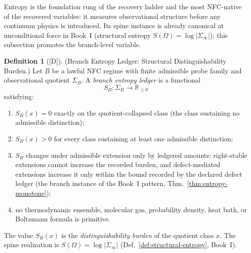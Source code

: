 \documentclass[12pt,oneside]{amsbook}
\theoremstyle{plain}
\theoremstyle{definition}
\newtheorem{definition}[theorem]{Definition}
\theoremstyle{remark}
\newcommand{\status}[1]{\textup{[#1]}}
\begin{document}
Entropy is the foundation rung of the recovery ladder and the most
NFC-native of the recovered variables: it measures observational
structure before any continuum physics is introduced.  Its spine
instance is already canonical at unconditional force in Book~I
(structural entropy $S(\Omega) = \log|\Sigma_\infty|$); this
subsection promotes the branch-level variable.

\begin{definition}[\status{D}]\label{def:branch-entropy-ledger}
\textup{(Branch Entropy Ledger: Structural Distinguishability
Burden.)}
Let $B$ be a lawful NFC regime with finite admissible probe family
and observational quotient $\Sigma_B$.  A \emph{branch entropy
ledger} is a functional
\[
  S_B : \Sigma_B \longrightarrow \mathbb{R}_{\ge 0}
\]
satisfying:
\begin{enumerate}[label=\textup{(S\arabic*)}]
  \item\label{es:zero} $S_B(x) = 0$ exactly on the
    quotient-collapsed class (the class sustaining no admissible
    distinction);
  \item\label{es:pos} $S_B(x) > 0$ for every class sustaining at
    least one admissible distinction;
  \item\label{es:ledger} $S_B$ changes under admissible extension
    only by ledgered amounts: right-stable extensions cannot
    increase the recorded burden, and defect-mediated extensions
    increase it only within the bound recorded by the declared
    defect ledger (the branch instance of the Book~I pattern,
    Thm.~\ref{thm:entropy-monotone});
  \item\label{es:anti} no thermodynamic ensemble, molecular gas,
    probability density, heat bath, or Boltzmann formula is
    primitive.
\end{enumerate}
The value $S_B(x)$ is the \emph{distinguishability burden} of the
quotient class $x$.  The spine realization is
$S(\Omega) = \log|\Sigma_\infty|$
(Def.~\ref{def:structural-entropy}, Book~I).
\end{definition}
\end{document}
